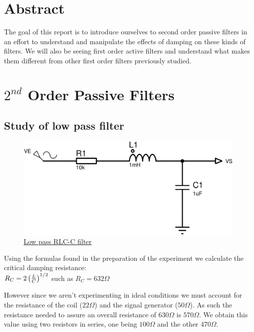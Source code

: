 \documentclass[11pt, openright]{book}
\begin{document}




\vspace*{\fill}

\section{Abstract}

The goal of this report is to introduce ourselves to second order passive filters in an effort to understand and manipulate the effects of damping on these kinds of filters. We will also be seeing first order active filters and understand what makes them different from other first order filters previously studied.


\newpage

\section{$2^{nd}$ Order Passive Filters}

\subsection{Study of low pass filter}

\begin{figure}[ht]
	\centering
	\includegraphics{./Circuit/Circuit1.jpeg}
	\caption{\underline{Low pass RLC-C filter}}
\end{figure}

Using the formulas found in the preparation of the experiment we calculate the critical damping resistance:\\
$R_C=2\left( \frac{L}{C} \right)^{1/2}$ such as $R_C=632\Omega$

However since we aren't experimenting in ideal conditions we must account for the resistance of the coil ($22\Omega$) and the signal generator ($50\Omega$). As such the resistance needed to assure an overall resistance of $630\Omega$ is $570\Omega$. We obtain this value using two resistors in series, one being $100\Omega$ and the other $470\Omega$.
\end{document}
